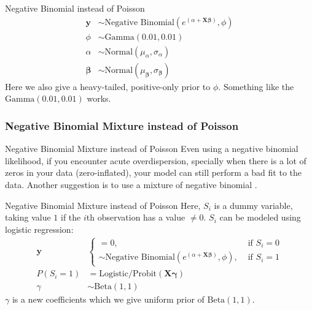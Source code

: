 \begin{frame}{Negative Binomial instead of Poisson}
	$$
		\begin{aligned}
			\mathbf{y}         & \sim \text{Negative Binomial} \left( e^{(\alpha + \mathbf{X} \boldsymbol{\beta})}, \phi \right) \\
			\phi               & \sim \text{Gamma}(0.01, 0.01)                                                                   \\
			\alpha             & \sim \text{Normal}(\mu_\alpha, \sigma_\alpha)                                                   \\
			\boldsymbol{\beta} & \sim \text{Normal}(\mu_{\boldsymbol{\beta}}, \sigma_{\boldsymbol{\beta}})
		\end{aligned}
	$$
	\vfill
	Here we also give a heavy-tailed, positive-only prior to $\phi$.
	Something like the $\text{Gamma}(0.01, 0.01)$ works.
\end{frame}

\subsubsection{Negative Binomial Mixture instead of Poisson}
\begin{frame}{Negative Binomial Mixture instead of Poisson}
	Even using a negative binomial likelihood,
	if you encounter acute overdispersion,
	specially when there is a lot of zeros in your data
	(zero-inflated),
	your model can still perform a bad fit to the data.
	\vfill
	Another suggestion is to use a mixture of negative binomial
	\parencite{mcelreath2020statistical}.
\end{frame}

\begin{frame}{Negative Binomial Mixture instead of Poisson}
	Here, $S_i$ is a dummy variable,
	taking value $1$ if the $i$th observation has a value $\neq 0$.
	$S_i$ can be modeled using logistic regression:
	$$
		\begin{aligned}
			\mathbf{y}
			           & \begin{cases}
				= 0,                                                                                             & \text{ if } S_i = 0 \\
				\sim \text{Negative Binomial} \left( e^{(\alpha + \mathbf{X} \boldsymbol{\beta})}, \phi \right), & \text{ if } S_i = 1
			\end{cases}                               \\
			P(S_i = 1) & = \text{Logistic/Probit}(\mathbf{X} \boldsymbol{\gamma}) \\
			\gamma     & \sim \text{Beta}(1, 1)
		\end{aligned}
	$$
	\vfill
	$\gamma$ is a new coefficients which we give uniform prior of $\text{Beta} (1, 1)$.
\end{frame}

